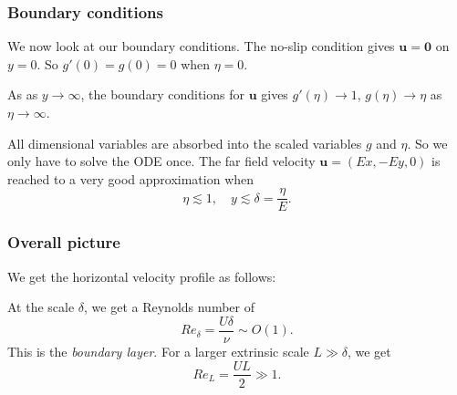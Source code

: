\documentclass[a4paper]{article}
\begin{document}
\subsubsection{Boundary conditions}
We now look at our boundary conditions. The no-slip condition gives $\mathbf{u} = \mathbf{0}$ on $y = 0$. So $g'(0) = g(0) = 0$ when $\eta = 0$.

As as $y \to \infty$, the boundary conditions for $\mathbf{u}$ gives $g'(\eta) \to 1$, $g(\eta) \to \eta$ as $\eta \to \infty$.

All dimensional variables are absorbed into the scaled variables $g$ and $\eta$. So we only have to solve the ODE once. The far field velocity $\mathbf{u} = (Ex, -E y, 0)$ is reached to a very good approximation when
\[
  \eta \lesssim 1,\quad y \lesssim \delta = \frac{\eta}{E}.
\]
\begin{center}
\end{center}

\subsubsection{Overall picture}
We get the horizontal velocity profile as follows:
\begin{center}
\end{center}
At the scale $\delta$, we get a Reynolds number of
\[
  Re_\delta = \frac{U\delta}{\nu}\sim O(1).
\]
This is the \emph{boundary layer}. For a larger extrinsic scale $L \gg \delta$, we get
\[
  Re_L = \frac{UL}{2} \gg 1.
\]
\end{document}
